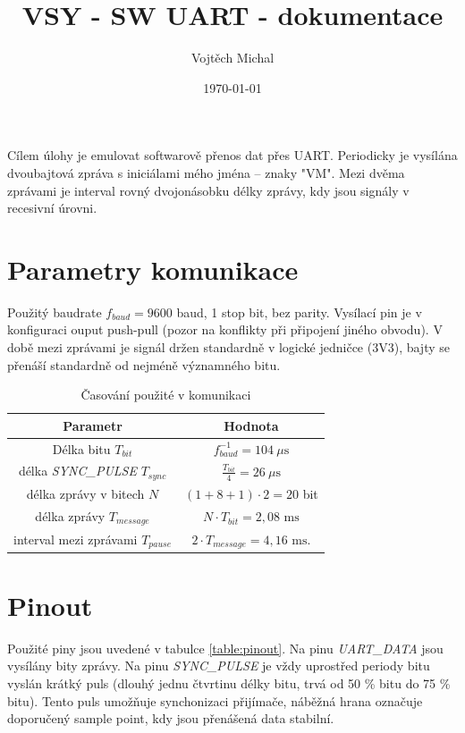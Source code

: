 \documentclass[twoside]{article}
\title{VSY - SW UART - dokumentace}
\author{Vojtěch Michal}
\date{\today}
\begin{document}
\maketitle

Cílem úlohy je emulovat softwarově přenos dat přes UART. Periodicky je vysílána dvoubajtová zpráva s iniciálami mého jména -- znaky "VM".
Mezi dvěma zprávami je interval rovný dvojonásobku délky zprávy, kdy jsou signály v recesivní úrovni.

\section{Parametry komunikace}
Použitý baudrate $f_{baud} = 9600$ baud, 1 stop bit, bez parity. Vysílací pin je v konfiguraci ouput push-pull (pozor na konflikty při připojení jiného obvodu).
V době mezi zprávami je signál držen standardně v logické jedničce (3V3), bajty se přenáší standardně od nejméně významného bitu.

\begin{table}[htbp]
    \centering
    \begin{tabular}{c|c}
        Parametr & Hodnota \\ \hline
        Délka bitu $T_{bit}$ & $ f_{baud}^{-1} = 104~\mu\text{s}$ \\
        délka \textit{SYNC\_PULSE} $T_{sync}$ & $\frac{T_{bit}}{4} = 26~\mu\text{s}$ \\
        délka zprávy v bitech $N$ & $(1+8+1) \cdot 2 = 20$ bit \\ 
        délka zprávy $T_{message}$&$N\cdot T_{bit} = 2,08 \text{ ms}$ \\
        interval mezi zprávami $T_{pause}$&$2\cdot T_{message} = 4,16 \text{ ms}$.
    \end{tabular}
    \caption{Časování použité v komunikaci}
    \label{table:casovani}
\end{table}


\section{Pinout}
Použité piny jsou uvedené v tabulce \ref{table:pinout}.
Na pinu \textit{UART\_DATA} jsou vysílány bity zprávy. Na pinu \textit{SYNC\_PULSE} je vždy uprostřed periody bitu vyslán krátký puls (dlouhý jednu čtvrtinu
délky bitu, trvá od 50 \% bitu do 75 \% bitu). Tento puls umožňuje synchonizaci přijímače, náběžná hrana označuje doporučený sample point, kdy jsou přenášená data stabilní.
\end{document}
